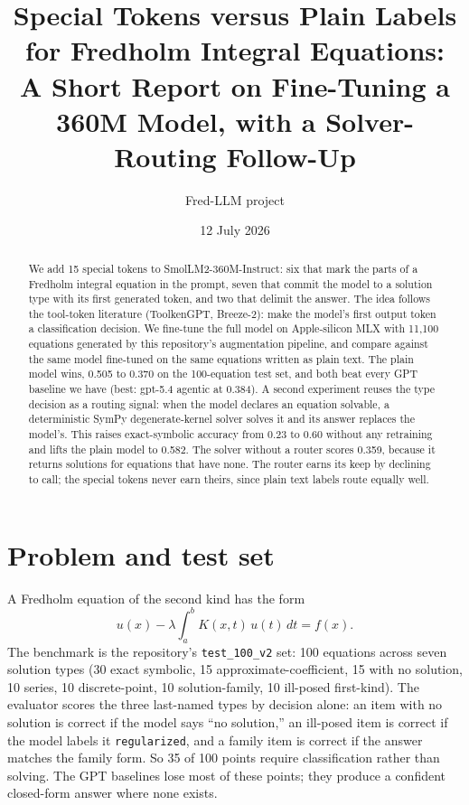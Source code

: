 \documentclass[11pt]{article}
\title{Special Tokens versus Plain Labels for Fredholm Integral Equations:\\
\large A Short Report on Fine-Tuning a 360M Model, with a Solver-Routing Follow-Up}
\author{Fred-LLM project}
\date{12 July 2026}
\begin{document}
\maketitle

\begin{abstract}
\noindent
We add 15 special tokens to SmolLM2-360M-Instruct: six that mark the parts of
a Fredholm integral equation in the prompt, seven that commit the model to a
solution type with its first generated token, and two that delimit the answer.
The idea follows the tool-token literature (ToolkenGPT, Breeze-2): make the
model's first output token a classification decision. We fine-tune the full
model on Apple-silicon MLX with 11{,}100 equations generated by this
repository's augmentation pipeline, and compare against the same model
fine-tuned on the same equations written as plain text. The plain model wins,
0.505 to 0.370 on the 100-equation test set, and both beat every GPT baseline
we have (best: gpt-5.4 agentic at 0.384). A second experiment reuses the type
decision as a routing signal: when the model declares an equation solvable, a
deterministic SymPy degenerate-kernel solver solves it and its answer replaces
the model's. This raises exact-symbolic accuracy from 0.23 to 0.60 without any
retraining and lifts the plain model to 0.582. The solver without a router
scores 0.359, because it returns solutions for equations that have none. The
router earns its keep by declining to call; the special tokens never earn
theirs, since plain text labels route equally well.
\end{abstract}

\section{Problem and test set}
A Fredholm equation of the second kind has the form
\[
u(x) - \lambda \int_a^b K(x,t)\,u(t)\,dt = f(x).
\]
The benchmark is the repository's \texttt{test\_100\_v2} set: 100 equations
across seven solution types (30 exact symbolic, 15 approximate-coefficient, 15
with no solution, 10 series, 10 discrete-point, 10 solution-family, 10
ill-posed first-kind). The evaluator scores the three last-named types by
decision alone: an item with no solution is correct if the model says
``no solution,'' an ill-posed item is correct if the model labels it
\texttt{regularized}, and a family item is correct if the answer matches the
family form. So 35 of 100 points require classification rather than solving.
The GPT baselines lose most of these points; they produce a confident
closed-form answer where none exists.
\end{document}
